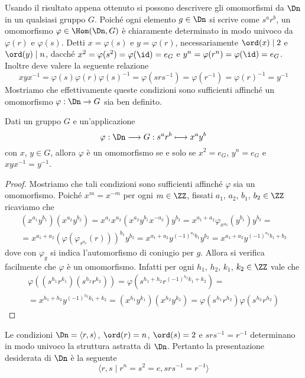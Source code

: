 \documentclass[11pt]{scrartcl}
\begin{document}
	Usando il risultato appena ottenuto si possono descrivere gli omomorfismi da $\Dn$ in 
	un qualsiasi gruppo $G$. Poiché ogni elemento $g \in \Dn$ si scrive come
	$s^ar^b$, un omomorfismo $\varphi \in \Hom(\Dn, G)$ è chiaramente
	determinato in modo univoco da $\varphi(r)$ e $\varphi(s)$. Detti $x = \varphi(s)$
	e $y = \varphi(r)$, necessariamente $\ord(x) \mid 2$
	e $\ord(y)\mid n$, dacché $x^2 = \varphi(s^2) = \varphi(\id) = e_G$ e
	$y^n = \varphi(r^n) = \varphi(\id) = e_G$. Inoltre deve valere la seguente relazione
	\[
	xyx^{-1} = \varphi(s)\varphi(r)\varphi(s)^{-1} = \varphi(srs^{-1}) = 
	\varphi(r^{-1}) = \varphi(r)^{-1} = y^{-1}
	\]Mostriamo che effettivamente queste condizioni sono sufficienti affinché un
	omomorfismo $\varphi : \Dn \to G$ sia ben definito.
	
	\begin{proposition}
		Dati un gruppo $G$ e un'applicazione
		\[
		\varphi: \Dn \longrightarrow G :s^ar^b \longmapsto x^ay^b
		\] con $x$, $y \in G$, allora $\varphi$ è un omomorfismo
		se e solo se $x^2 = e_G$, $y^n = e_G$ e $xyx^{-1} = y^{-1}$.
	\end{proposition}
	
	\begin{proof}
		Mostriamo che tali condizioni sono sufficienti affinché $\varphi$ sia un 
		omomorfismo. Poiché $x^m = x^{-m}$ per ogni $m \in \ZZ$, fissati 
		$a_1$, $a_2$, $b_1$, $b_2 \in \ZZ$ ricaviamo che 
		\begin{multline*}
			(x^{a_1}y^{b_1})(x^{a_2}y^{b_2}) = x^{a_1}x^{a_2}(x^{a_2}y^{b_1}x^{-a_2})y^{b_2} = 
			x^{a_1 + a_2}\varphi_{x^{a_2}}(y^{b_1})y^{b_2} = \\
			= x^{a_1 + a_2} (\varphi(\varphi_{s^{a_2}}(r)))^{b_1}y^{b_2} =
			x^{a_1 + a_2}y^{(-1)^{a_2}b_1}y^{b_2} = x^{a_1 + a_2}y^{(-1)^{a_2}b_1 + b_2}
		\end{multline*} dove con $\varphi_g$ si indica l'automorfismo di coniugio per $g$.
		Allora si verifica facilmente che $\varphi$ è un omomorfismo. Infatti per ogni $h_1$, $h_2$, $k_1$, $k_2 \in \ZZ$ vale che
		\begin{multline*}
			\varphi((s^{h_1}r^{k_1})(s^{h_2}r^{k_2})) = \varphi(s^{h_1 + h_2}r^{(-1)^{h_2}k_1 + k_2}) =\\
			= x^{h_1 + h_2}y^{(-1)^{h_2}k_1 + k_2} = (x^{h_1}y^{k_1})(x^{h_2}y^{k_2}) = 
			\varphi(s^{h_1}r^{h_2})\varphi(s^{h_2}r^{h_2})
		\end{multline*}
	\end{proof}
	
	\begin{remark}
		Le condizioni $\Dn = \langle r, s\rangle$, $\ord(r) = n$,
		$\ord(s) = 2$ e $srs^{-1} = r^{-1}$ determinano in modo univoco 
		la struttura astratta di $\Dn$. Pertanto la presentazione desiderata
		di $\Dn$ è la seguente
		\[
		\langle r, s\mid r^n = s^2 = e, srs^{-1} = r^{-1}\rangle
		\]
	\end{remark}
	
\end{document}
